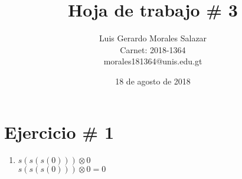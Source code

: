 \documentclass{article}
\title{Hoja de trabajo \# 3}
\author{Luis Gerardo Morales Salazar \\Carnet: 2018-1364\\ morales181364@unis.edu.gt}
\date{18 de agosto de 2018}
\begin{document}
\maketitle
\section{Ejercicio \# 1}

\begin{enumerate}
$Sumar:  s(s(s(0))) \oplus s(s(s(s(0))))
\\\\s(s(s(0))) \oplus  s(s(s(s(0))))
\\s(s(s(s(0))) \oplus  s(s(s(0))))
\\s(s(s(s(s(0))) \oplus  s(s(0))))
\\s(s(s(s(s(s(0))) \oplus  (s(0))))
\\s(s(s(s(s(s(s(0\oplus0))))
\\s(s(s(s(s(s(s(0)))))))$

\\\\ \section{Ejercicio \#2}
Definir la multiplicación para numeros naturales unarios:

\[n\otimes m := \left\{
\begin{array}{l l}
\\0 & \mbox{si } n=0 \\
\\0 & \mbox{si } m=0 \\
\\0 & \mbox{si } m=0,n=0 \\
\\m & \mbox{si } n=1 \\
\\n & \mbox{si } m=1 \\
\\s(i)\oplus(s(i)\otimes j) & \mbox{si } n=s(i)
\\ \end{array}
\right.\]

\section{Ejercicio \#3}

\item {$s(s(s(0)))\otimes 0$
\\$s(s(s(0))) \otimes 0 = 0$}


\end{enumerate}
\end{document}
